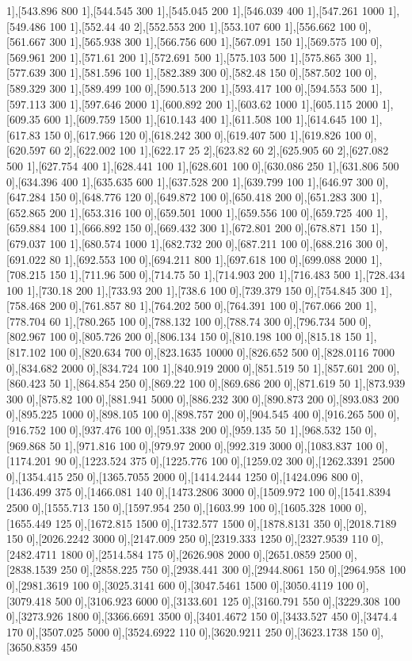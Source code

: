 {1],[543.896 800 1],[544.545 300 1],[545.045 200 1],[546.039 400 1],[547.261 1000 1],[549.486 100 1],[552.44 40 2],[552.553 200 1],[553.107 600 1],[556.662 100 0],[561.667 300 1],[565.938 300 1],[566.756 600 1],[567.091 150 1],[569.575 100 0],[569.961 200 1],[571.61 200 1],[572.691 500 1],[575.103 500 1],[575.865 300 1],[577.639 300 1],[581.596 100 1],[582.389 300 0],[582.48 150 0],[587.502 100 0],[589.329 300 1],[589.499 100 0],[590.513 200 1],[593.417 100 0],[594.553 500 1],[597.113 300 1],[597.646 2000 1],[600.892 200 1],[603.62 1000 1],[605.115 2000 1],[609.35 600 1],[609.759 1500 1],[610.143 400 1],[611.508 100 1],[614.645 100 1],[617.83 150 0],[617.966 120 0],[618.242 300 0],[619.407 500 1],[619.826 100 0],[620.597 60 2],[622.002 100 1],[622.17 25 2],[623.82 60 2],[625.905 60 2],[627.082 500 1],[627.754 400 1],[628.441 100 1],[628.601 100 0],[630.086 250 1],[631.806 500 0],[634.396 400 1],[635.635 600 1],[637.528 200 1],[639.799 100 1],[646.97 300 0],[647.284 150 0],[648.776 120 0],[649.872 100 0],[650.418 200 0],[651.283 300 1],[652.865 200 1],[653.316 100 0],[659.501 1000 1],[659.556 100 0],[659.725 400 1],[659.884 100 1],[666.892 150 0],[669.432 300 1],[672.801 200 0],[678.871 150 1],[679.037 100 1],[680.574 1000 1],[682.732 200 0],[687.211 100 0],[688.216 300 0],[691.022 80 1],[692.553 100 0],[694.211 800 1],[697.618 100 0],[699.088 2000 1],[708.215 150 1],[711.96 500 0],[714.75 50 1],[714.903 200 1],[716.483 500 1],[728.434 100 1],[730.18 200 1],[733.93 200 1],[738.6 100 0],[739.379 150 0],[754.845 300 1],[758.468 200 0],[761.857 80 1],[764.202 500 0],[764.391 100 0],[767.066 200 1],[778.704 60 1],[780.265 100 0],[788.132 100 0],[788.74 300 0],[796.734 500 0],[802.967 100 0],[805.726 200 0],[806.134 150 0],[810.198 100 0],[815.18 150 1],[817.102 100 0],[820.634 700 0],[823.1635 10000 0],[826.652 500 0],[828.0116 7000 0],[834.682 2000 0],[834.724 100 1],[840.919 2000 0],[851.519 50 1],[857.601 200 0],[860.423 50 1],[864.854 250 0],[869.22 100 0],[869.686 200 0],[871.619 50 1],[873.939 300 0],[875.82 100 0],[881.941 5000 0],[886.232 300 0],[890.873 200 0],[893.083 200 0],[895.225 1000 0],[898.105 100 0],[898.757 200 0],[904.545 400 0],[916.265 500 0],[916.752 100 0],[937.476 100 0],[951.338 200 0],[959.135 50 1],[968.532 150 0],[969.868 50 1],[971.816 100 0],[979.97 2000 0],[992.319 3000 0],[1083.837 100 0],[1174.201 90 0],[1223.524 375 0],[1225.776 100 0],[1259.02 300 0],[1262.3391 2500 0],[1354.415 250 0],[1365.7055 2000 0],[1414.2444 1250 0],[1424.096 800 0],[1436.499 375 0],[1466.081 140 0],[1473.2806 3000 0],[1509.972 100 0],[1541.8394 2500 0],[1555.713 150 0],[1597.954 250 0],[1603.99 100 0],[1605.328 1000 0],[1655.449 125 0],[1672.815 1500 0],[1732.577 1500 0],[1878.8131 350 0],[2018.7189 150 0],[2026.2242 3000 0],[2147.009 250 0],[2319.333 1250 0],[2327.9539 110 0],[2482.4711 1800 0],[2514.584 175 0],[2626.908 2000 0],[2651.0859 2500 0],[2838.1539 250 0],[2858.225 750 0],[2938.441 300 0],[2944.8061 150 0],[2964.958 100 0],[2981.3619 100 0],[3025.3141 600 0],[3047.5461 1500 0],[3050.4119 100 0],[3079.418 500 0],[3106.923 6000 0],[3133.601 125 0],[3160.791 550 0],[3229.308 100 0],[3273.926 1800 0],[3366.6691 3500 0],[3401.4672 150 0],[3433.527 450 0],[3474.4 170 0],[3507.025 5000 0],[3524.6922 110 0],[3620.9211 250 0],[3623.1738 150 0],[3650.8359 450 }
